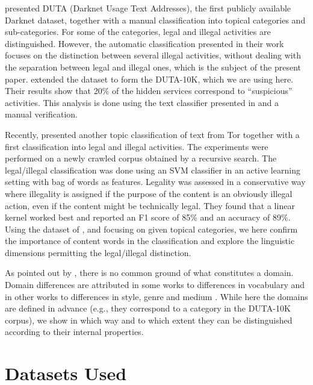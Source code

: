 \documentclass[11pt,a4paper,table]{article}
\newcommand{\oa}[1]{\footnote{\color{red}OA: #1}}
\begin{document}
\citet{AlNabki17} presented DUTA (Darknet Usage Text Addresses), the first publicly available Darknet dataset, together with a manual classification into topical categories and sub-categories. For some of the categories, legal and illegal activities are distinguished. However, the automatic classification presented in their work focuses on the distinction between several illegal activities, without dealing with the separation between legal and illegal ones, which is the subject of the present paper. \citet{AlNabki19} extended the dataset to form the DUTA-10K, which we are using here. Their results show that 20\% of the hidden services correspond to ``suspicious'' activities. This analysis is done using the text classifier presented in \citet{AlNabki17} and a manual verification. %

Recently, \citet{Avarikioti18} presented another topic classification of text from Tor together with a first classification into legal and illegal activities.  The experiments were performed on a newly crawled corpus obtained by a recursive search. The legal/illegal classification was done using an SVM classifier in an active learning setting with bag of words as features. Legality was assessed in a conservative way where illegality is assigned if the purpose of the content is an obviously illegal action, even if the content might be technically legal. They found that a linear kernel worked best and reported an F1 score of 85\% and an accuracy of 89\%. Using the dataset of \citet{AlNabki19}, and focusing on given topical categories, we here confirm the importance of content words in the classification and explore the linguistic dimensions permitting the legal/illegal distinction. 

As pointed out by \citet{Plank11}, there is no common ground of what constitutes a domain. Domain differences are attributed in some works to differences in vocabulary \citep{Blitzer06} and in other works to differences in style, genre and medium \citep{McClosky2010}. While here the domains are defined in advance (e.g., they correspond to a category in the DUTA-10K corpus), we show in which way and to which extent they can be distinguished according to their internal properties. 

\section{Datasets Used}\label{sec:datasets}
\end{document}

